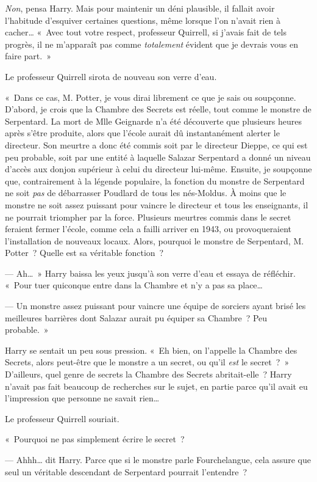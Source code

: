 \emph{Non}, pensa Harry.
Mais pour maintenir un déni plausible, il fallait avoir l'habitude d'esquiver certaines questions, même lorsque l'on n'avait rien à cacher…
«~Avec tout votre respect, professeur Quirrell, si j'avais fait de tels progrès, il ne m'apparaît pas comme \emph{totalement} évident que je devrais vous en faire part.~»

Le professeur Quirrell sirota de nouveau son verre d'eau.

«~Dans ce cas, M. Potter, je vous dirai librement ce que je sais ou soupçonne.
D'abord, je crois que la Chambre des Secrets est réelle, tout comme le monstre de Serpentard.
La mort de Mlle Geignarde n'a été découverte que plusieurs heures après s'être produite, alors que l'école aurait dû instantanément alerter le directeur.
Son meurtre a donc été commis soit par le directeur Dieppe, ce qui est peu probable, soit par une entité à laquelle Salazar Serpentard a donné un niveau d'accès aux donjon supérieur à celui du directeur lui-même.
Ensuite, je soupçonne que, contrairement à la légende populaire, la fonction du monstre de Serpentard ne soit \emph{pas} de débarrasser Poudlard de tous les nés-Moldus.
À moins que le monstre ne soit assez puissant pour vaincre le directeur et tous les enseignants, il ne pourrait triompher par la force.
Plusieurs meurtres commis dans le secret feraient fermer l'école, comme cela a failli arriver en 1943, ou provoqueraient l'installation de nouveaux locaux.
Alors, pourquoi le monstre de Serpentard, M. Potter~?
Quelle est sa véritable fonction~?

--- Ah…~» Harry baissa les yeux jusqu'à son verre d'eau et essaya de réfléchir.
«~Pour tuer quiconque entre dans la Chambre et n'y a pas sa place…

--- Un monstre assez puissant pour vaincre une équipe de sorciers ayant brisé les meilleures barrières dont Salazar aurait pu équiper sa Chambre~?
Peu probable.~»

Harry se sentait un peu sous pression.
«~Eh bien, on l'appelle la Chambre des Secrets, alors peut-être que le monstre a un secret, ou qu'il \emph{est} le secret~?~»
D'ailleurs, quel genre de secrets la Chambre des Secrets abritait-elle~?
Harry n'avait pas fait beaucoup de recherches sur le sujet, en partie parce qu'il avait eu l'impression que personne ne savait rien…

Le professeur Quirrell souriait.

«~Pourquoi ne pas simplement écrire le secret~?

--- Ahhh… dit Harry.
Parce que si le monstre parle Fourchelangue, cela assure que seul un véritable descendant de Serpentard pourrait l'entendre~?

